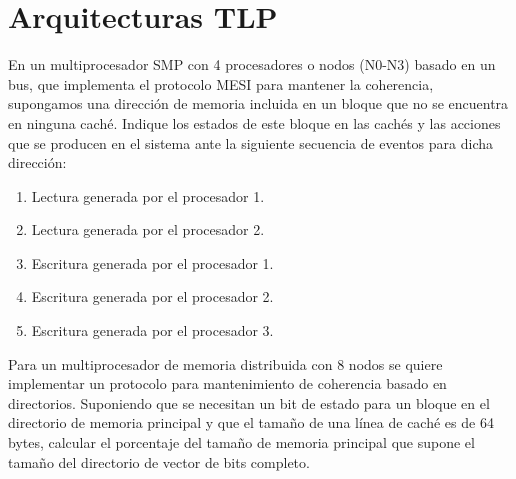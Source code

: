\section{Arquitecturas TLP}

\begin{ejercicio}
    En un multiprocesador SMP con 4 procesadores o nodos (N0-N3) basado en un bus, que
    implementa el protocolo MESI para mantener la coherencia, supongamos una dirección de memoria incluida
    en un bloque que no se encuentra en ninguna caché. Indique los estados de este bloque en las cachés y las
    acciones que se producen en el sistema ante la siguiente secuencia de eventos para dicha dirección:
    \begin{enumerate}
        \item Lectura generada por el procesador 1.
        \item Lectura generada por el procesador 2.
        \item Escritura generada por el procesador 1.
        \item Escritura generada por el procesador 2.
        \item Escritura generada por el procesador 3.
    \end{enumerate}
\end{ejercicio}

\begin{ejercicio}
    Para un multiprocesador de memoria distribuida con $8$ nodos se quiere implementar un
    protocolo para mantenimiento de coherencia basado en directorios. Suponiendo que se necesitan un bit de
    estado para un bloque en el directorio de memoria principal y que el tamaño de una línea de caché es de 64
    bytes, calcular el porcentaje del tamaño de memoria principal que supone el tamaño del directorio de vector
    de bits completo.
\end{ejercicio}

